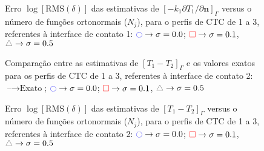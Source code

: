 \begin{figure}[h!b]
	\caption{Erro $\log[\text{RMS}(\delta)]$ das estimativas de $[-k_1 \partial T_1/\partial\mathbf{n}]_\Gamma$ versus o número de funções ortonormais ($N_j$), para o perfis de CTC de 1 a 3, referentes à interface de contato 1: $\textcolor{blue}{\ocircle} \rightarrow \sigma = 0.0$; $\textcolor{red}{\square} \rightarrow \sigma = 0.1$, $\textcolor{gray}{\triangle} \rightarrow \sigma = 0.5$}
\end{figure}

\begin{figure}[h!b]
\end{figure}


\begin{figure}[h!b]
	\caption{Comparação entre as estimativas de $[T_1 - T_2]_\Gamma$ e os valores exatos para os perfis de CTC de 1 a 3, referentes à interface de contato 2: $\text{--} \rightarrow \text{Exato}$; $\textcolor{blue}{\ocircle} \rightarrow \sigma = 0.0$; $\textcolor{red}{\square} \rightarrow \sigma = 0.1$, $\textcolor{gray}{\triangle} \rightarrow \sigma = 0.5$}
\end{figure}

\begin{figure}[h!b]
	\caption{Erro $\log[\text{RMS}(\delta)]$ das estimativas de $[T_1 - T_2]_\Gamma$ versus o número de funções ortonormais ($N_j$), para o perfis de CTC de 1 a 3, referentes à interface de contato 2: $\textcolor{blue}{\ocircle} \rightarrow \sigma = 0.0$; $\textcolor{red}{\square} \rightarrow \sigma = 0.1$, $\textcolor{gray}{\triangle} \rightarrow \sigma = 0.5$}
\end{figure}

